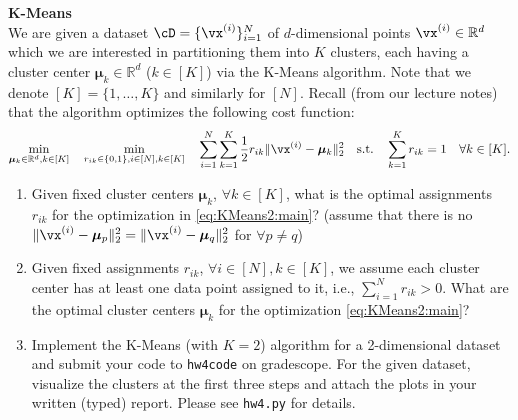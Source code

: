 \begin{Q}
\textbf{\Large K-Means}\\

We are given a dataset $\cD = \{\vx^{(i)}\}_{i=1}^N$ of $d$-dimensional points $\vx^{(i)}\in\mathbb{R}^d$ which we are interested in partitioning them into $K$ clusters, each having a cluster center $\bm{\mu}_k\in \mathbb{R}^d$ ($k\in [K]$) via the K-Means algorithm. Note that we denote $[K]=\{1, \dots, K\}$ and similarly for $[N]$. Recall (from our lecture notes) that the algorithm optimizes the following cost function:
\begin{equation}
	\min_{\bm{\mu}_k\in \mathbb{R}^d, k\in [K]}\quad \min_{r_{ik}\in \{0, 1\}, i\in [N], k\in [K]} \quad \sum_{i=1}^N\sum_{k=1}^K\frac{1}{2} r_{ik} \|\vx^{(i)}-\bm{\mu}_k\|_2^2\quad \text{s.t.} \quad \sum_{k=1}^K r_{ik}=1\quad \forall k\in [K].
\label{eq:KMeans2:main}
\end{equation}

\begin{enumerate}

\item Given fixed cluster centers $\bm{\mu}_k$, $\forall k\in[K]$, what is the optimal assignments $r_{ik}$ for the optimization in \eqref{eq:KMeans2:main}? (assume that there is no $\|\vx^{(i)}-\bm{\mu}_p\|_2^2=\|\vx^{(i)}-\bm{\mu}_q\|_2^2$ for $\forall p \neq q$) 

\item Given fixed assignments $r_{ik}$, $\forall i\in[N], k\in[K]$, we assume each cluster center has at least one data point assigned to it, i.e., $\sum_{i=1}^N r_{ik}>0$. What are the optimal cluster centers $\bm{\mu}_k$ for the optimization \eqref{eq:KMeans2:main}? 

\item Implement the K-Means (with $K=2$) algorithm for a 2-dimensional dataset and submit your code to \texttt{hw4code} on gradescope. For the given dataset, visualize the clusters at the first three steps and attach the plots in your written (typed) report. Please see  \texttt{hw4.py} for details. 


\end{enumerate}

\end{Q}

\begin{tcolorbox}


\end{tcolorbox}